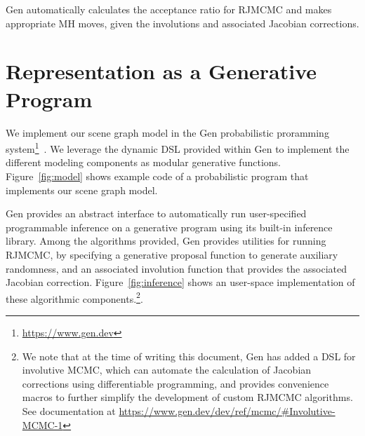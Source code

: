 Gen automatically calculates the acceptance ratio for RJMCMC and makes appropriate MH moves, given the involutions and associated Jacobian corrections.

\section{Representation as a Generative Program}
We implement our scene graph model in the Gen probabilistic proramming system\footnote{\url{https://www.gen.dev}}~\cite{Cusumano-Towner:2019:GGP:3314221.3314642}.
We leverage the dynamic DSL provided within Gen to implement the different modeling components as modular generative functions.
Figure~\ref{fig:model} shows example code of a probabilistic program that implements our scene graph model.

Gen provides an abstract interface to automatically run user-specified programmable inference on a generative program using its built-in inference library.
Among the algorithms provided, Gen provides utilities for running RJMCMC, by specifying a generative proposal function to generate auxiliary randomness, and an associated involution function that provides the associated Jacobian correction.
Figure~\ref{fig:inference} shows an user-space implementation of these algorithmic components.\footnote{
  We note that at the time of writing this document, Gen has added a DSL for involutive MCMC, which can automate the calculation of Jacobian corrections using differentiable programming, and provides convenience macros to further simplify the development of custom RJMCMC algorithms.
  See documentation at \url{https://www.gen.dev/dev/ref/mcmc/\#Involutive-MCMC-1}
}.


\lstset{language=julia}
\lstset{style=Gen}

